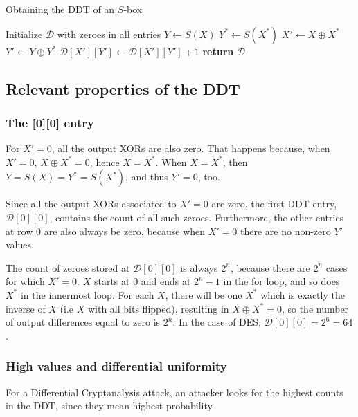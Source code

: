 \documentclass{report}
\begin{document}
\begin{algorithm}[H]
\caption{Obtaining the DDT of an $S$-box}
\label{alg:ddt}
\begin{algorithmic}[1]
    \State Initialize $\mathcal{D}$ with zeroes in all entries
            \State $Y \gets S(X)$
            \State $Y^* \gets S(X^*)$
            \State $X' \gets X \oplus X^*$
            \State $Y' \gets Y \oplus Y^*$
            \State $\mathcal{D}[X'][Y'] \gets \mathcal{D}[X'][Y'] + 1$
        \EndFor
    \EndFor
\State \textbf{return} $\mathcal{D}$
\end{algorithmic}
\end{algorithm}

\subsection{Relevant properties of the DDT}

\subsubsection{The [0][0] entry}

For $X' = 0$, all the output XORs are also zero. That happens because, when $X' = 0$, $X \oplus X^* = 0$, hence $X = X^*$. When $X = X^*$, then $Y = S(X) = Y^* = S(X^*)$, and thus $Y' = 0$, too. 

Since all the output XORs associated to $X' = 0$ are zero, the first DDT entry, $\mathcal{D}[0][0]$, contains the count of all such zeroes. Furthermore, the other entries at row $0$ are also always be zero, because when $X' = 0$ there are no non-zero $Y'$ values.

The count of zeroes stored at $\mathcal{D}[0][0]$ is always $2^n$, because there are $2^n$ cases for which $X' = 0$. $X$ starts at $0$ and ends at $2^n-1$ in the for loop, and so does $X^*$ in the innermost loop. For each $X$, there will be one $X^*$ which is exactly the inverse of $X$ (i.e $X$ with all bits flipped), resulting in $X \oplus X^* = 0$, so the number of output differences equal to zero is $2^n$. In the case of DES, $\mathcal{D}[0][0] = 2^6 = 64$.

\subsubsection{High values and differential uniformity}
For a Differential Cryptanalysis attack, an attacker looks for the highest counts in the DDT, since they mean highest probability.
\end{document}
